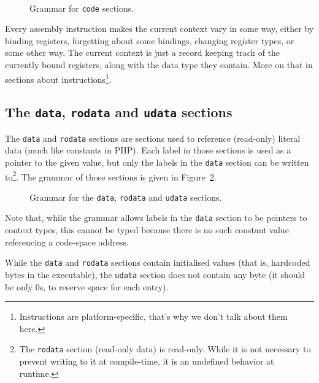 \begin{figure}[htb]
  \centering
  \\

  \caption{Grammar for \texttt{code} sections.}
  \label{fig:nstar-common-sections-code-grammar}
\end{figure}

Every assembly instruction makes the current context vary in some way, either by binding registers, forgetting about some bindings, changing register types, or some other way. The current context is just a record keeping track of the currently bound registers, along with the data type they contain.
More on that in sections about instructions\footnote{Instructions are platform-specific, that's why we don't talk about them here.}.

\subsection{The \texttt{data}, \texttt{rodata} and \texttt{udata} sections}\label{subsec:nstar-common-sections-data}

The \texttt{data} and \texttt{rodata} sections are sections used to reference (read-only) literal data (much like constants in PHP).
Each label in those sections is used as a pointer to the given value, but only the labels in the \texttt{data} section can be written to\footnote{The \texttt{rodata} section (read-only data) is read-only. While it is not necessary to prevent writing to it at compile-time, it is an undefined behavior at runtime.}.
The grammar of those sections is given in Figure~\ref{fig:nstar-common-sections-data-grammar}.

\begin{figure}[htb]
  \centering

  \caption{Grammar for the \texttt{data}, \texttt{rodata} and \texttt{udata} sections.}
  \label{fig:nstar-common-sections-data-grammar}
\end{figure}

\noindent Note that, while the grammar allows labels in the \texttt{data} section to be pointers to context types, this cannot be typed because there is no such constant value referencing a code-space address.

While the \texttt{data} and \texttt{rodata} sections contain initialised values (that is, hardcoded bytes in the executable), the \texttt{udata} section does not contain any byte (it should be only $0$s, to reserve space for each entry).

